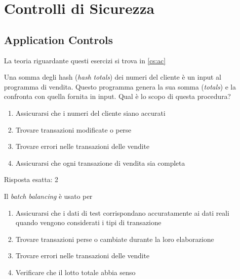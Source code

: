 \section{Controlli di Sicurezza}
\label{esCs}

\subsection{Application Controls}
\label{esCs:ac}

La teoria riguardante questi esercizi si trova in \ref{cs:ac}


\begin{Exercise} [
  title={Quiz},
  label={esCs1}
  ]

  \Question Una somma degli hash (\textit{hash totals}) dei numeri del
cliente è un input al programma di vendita. Questo programma genera la
sua somma (\textit{totals}) e la confronta con quella fornita in input.
Qual è lo scopo di questa procedura?
\begin{enumerate}
 \item Assicurarsi che i numeri del cliente siano accurati
 \item Trovare transazioni modificate o perse
 \item Trovare errori nelle transazioni delle vendite
 \item Assicurarsi che ogni transazione di vendita sia completa
\end{enumerate}

\end{Exercise}

\begin{Answer} [
  ref={esCs1},
  number={1}
  ]

  \Question Risposta esatta: 2
\end{Answer}


\begin{Exercise} [
  title={Quiz},
  label={esCs2}
  ]

  \Question Il \textit{batch balancing} \`e usato per
  \begin{enumerate}
   \item Assicurarsi che i dati di test corrispondano accuratamente ai dati
reali quando vengono considerati i tipi di transazione
   \item Trovare transazioni perse o cambiate durante la loro elaborazione
   \item Trovare errori nelle transazioni delle vendite
   \item Verificare che il lotto totale abbia senso
  \end{enumerate}
\end{Exercise}

